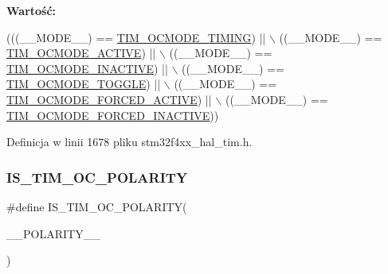 {\bfseries Wartość\+:}
\begin{DoxyCode}
(((\_\_MODE\_\_) == \hyperlink{group___t_i_m___output___compare__and___p_w_m__modes_gafae6b98b4b854fbfffd9a5ebc59c8f61}{TIM\_OCMODE\_TIMING})             || \(\backslash\)
                                   ((\_\_MODE\_\_) == \hyperlink{group___t_i_m___output___compare__and___p_w_m__modes_ga111d1023e3ac6ef5544775c3863b4b12}{TIM\_OCMODE\_ACTIVE})             || \(\backslash\)
                                   ((\_\_MODE\_\_) == \hyperlink{group___t_i_m___output___compare__and___p_w_m__modes_ga890fbb44fd16f2bce962983352d23f53}{TIM\_OCMODE\_INACTIVE})           || \(\backslash\)
                                   ((\_\_MODE\_\_) == \hyperlink{group___t_i_m___output___compare__and___p_w_m__modes_ga368f80fad76018e2bf76084522e47536}{TIM\_OCMODE\_TOGGLE})             || \(\backslash\)
                                   ((\_\_MODE\_\_) == \hyperlink{group___t_i_m___output___compare__and___p_w_m__modes_ga0a78cecaf884a89963e2a8e6af7e6128}{TIM\_OCMODE\_FORCED\_ACTIVE})      ||
       \(\backslash\)
                                   ((\_\_MODE\_\_) == \hyperlink{group___t_i_m___output___compare__and___p_w_m__modes_ga4572f724ce30ce45557f1dc5141afb3e}{TIM\_OCMODE\_FORCED\_INACTIVE}))
\end{DoxyCode}


Definicja w linii 1678 pliku stm32f4xx\+\_\+hal\+\_\+tim.\+h.

\mbox{\label{group___t_i_m___private___macros_gaff2871b7c01f0b706f90feb046995b95}} 
\subsubsection{\texorpdfstring{I\+S\+\_\+\+T\+I\+M\+\_\+\+O\+C\+\_\+\+P\+O\+L\+A\+R\+I\+TY}{IS\_TIM\_OC\_POLARITY}}
{\footnotesize\ttfamily \#define I\+S\+\_\+\+T\+I\+M\+\_\+\+O\+C\+\_\+\+P\+O\+L\+A\+R\+I\+TY(\begin{DoxyParamCaption}\item[{}]{\+\_\+\+\_\+\+P\+O\+L\+A\+R\+I\+T\+Y\+\_\+\+\_\+ }\end{DoxyParamCaption})}

